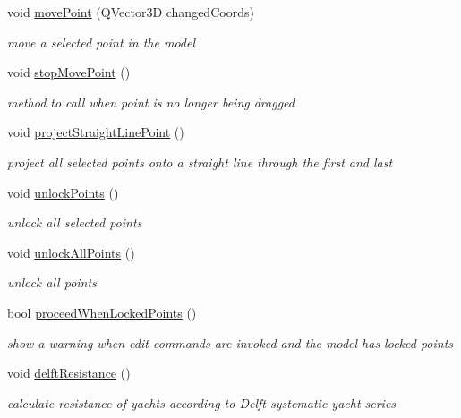 \begin{DoxyCompactItemize}
void \hyperlink{classShipCAD_1_1Controller_a8f573f351b3f9568618e44ab39fb2a7e}{move\+Point} (Q\+Vector3D changed\+Coords)
\begin{DoxyCompactList}\small\item\em move a selected point in the model \end{DoxyCompactList}\item 
void \hyperlink{classShipCAD_1_1Controller_ac7684b3ff9abd0fa80f9ab0c95458a03}{stop\+Move\+Point} ()
\begin{DoxyCompactList}\small\item\em method to call when point is no longer being dragged \end{DoxyCompactList}\item 
void \hyperlink{classShipCAD_1_1Controller_aaf39d00fed33f46dea7d5f6a8b5839f1}{project\+Straight\+Line\+Point} ()
\begin{DoxyCompactList}\small\item\em project all selected points onto a straight line through the first and last \end{DoxyCompactList}\item 
void \hyperlink{classShipCAD_1_1Controller_a7038d511c9398f34ec9df3d0a1311b14}{unlock\+Points} ()
\begin{DoxyCompactList}\small\item\em unlock all selected points \end{DoxyCompactList}\item 
void \hyperlink{classShipCAD_1_1Controller_af983f99c449cd485a6362768a64d3c1e}{unlock\+All\+Points} ()
\begin{DoxyCompactList}\small\item\em unlock all points \end{DoxyCompactList}\item 
bool \hyperlink{classShipCAD_1_1Controller_a2b2d3d9fbd9fd115ae8e80fa57930277}{proceed\+When\+Locked\+Points} ()
\begin{DoxyCompactList}\small\item\em show a warning when edit commands are invoked and the model has locked points \end{DoxyCompactList}\item 
void \hyperlink{classShipCAD_1_1Controller_a6809e5172d21a2bdd439317e533d9c0b}{delft\+Resistance} ()
\begin{DoxyCompactList}\small\item\em calculate resistance of yachts according to Delft systematic yacht series \end{DoxyCompactList}\item 

\end{DoxyCompactItemize}
